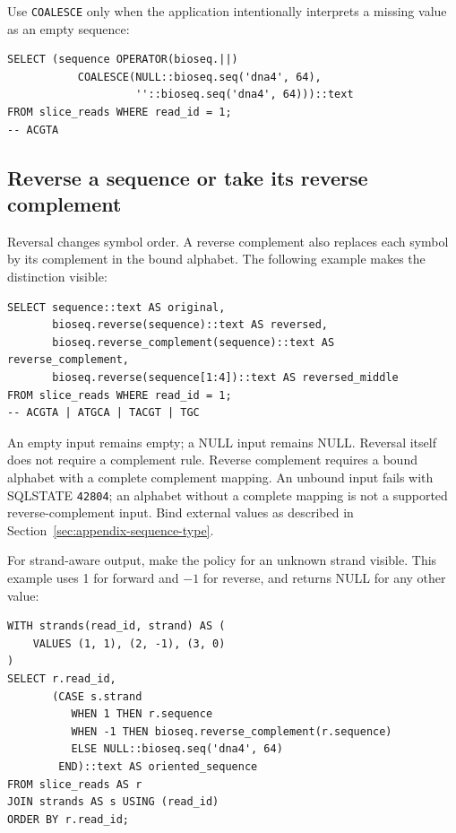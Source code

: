Use \texttt{COALESCE} only when the application intentionally interprets a
missing value as an empty sequence:

\par\noindent\begin{minipage}{\linewidth}
\begin{lstlisting}[style=bioseq-appendix-sql]
SELECT (sequence OPERATOR(bioseq.||)
           COALESCE(NULL::bioseq.seq('dna4', 64),
                    ''::bioseq.seq('dna4', 64)))::text
FROM slice_reads WHERE read_id = 1;
-- ACGTA
\end{lstlisting}
\end{minipage}

\subsection{Reverse a sequence or take its reverse complement}

Reversal changes symbol order. A reverse complement also replaces each
symbol by its complement in the bound alphabet. The following example makes
the distinction visible:

\par\noindent\begin{minipage}{\linewidth}
\begin{lstlisting}[style=bioseq-appendix-sql]
SELECT sequence::text AS original,
       bioseq.reverse(sequence)::text AS reversed,
       bioseq.reverse_complement(sequence)::text AS reverse_complement,
       bioseq.reverse(sequence[1:4])::text AS reversed_middle
FROM slice_reads WHERE read_id = 1;
-- ACGTA | ATGCA | TACGT | TGC
\end{lstlisting}
\end{minipage}

An empty input remains empty; a NULL input remains NULL. Reversal itself
does not require a complement rule. Reverse complement requires a bound
alphabet with a complete complement mapping. An unbound input fails with
SQLSTATE \texttt{42804}; an alphabet without a complete mapping is not a
supported reverse-complement input. Bind external values as described in
Section~\ref{sec:appendix-sequence-type}.

For strand-aware output, make the policy for an unknown strand visible.
This example uses 1 for forward and $-1$ for reverse, and returns NULL for
any other value:

\par\noindent\begin{minipage}{\linewidth}
\begin{lstlisting}[style=bioseq-appendix-sql]
WITH strands(read_id, strand) AS (
    VALUES (1, 1), (2, -1), (3, 0)
)
SELECT r.read_id,
       (CASE s.strand
          WHEN 1 THEN r.sequence
          WHEN -1 THEN bioseq.reverse_complement(r.sequence)
          ELSE NULL::bioseq.seq('dna4', 64)
        END)::text AS oriented_sequence
FROM slice_reads AS r
JOIN strands AS s USING (read_id)
ORDER BY r.read_id;
\end{lstlisting}
\end{minipage}

